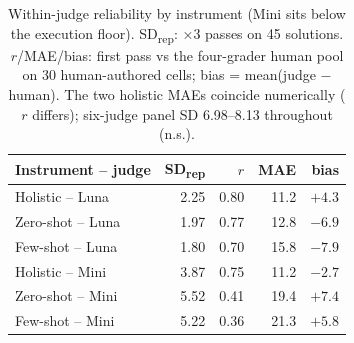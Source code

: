 \begin{table}[t]
\centering
\scriptsize
\begin{tabular}{@{}lrrrr@{}}
\toprule
Instrument – judge & SD\textsubscript{rep} & $r$ & MAE & bias \\
\midrule
Holistic – Luna & 2.25 & 0.80 & 11.2 & $+4.3$ \\
Zero-shot – Luna & 1.97 & 0.77 & 12.8 & $-6.9$ \\
Few-shot – Luna & 1.80 & 0.70 & 15.8 & $-7.9$ \\
\midrule
Holistic – Mini & 3.87 & 0.75 & 11.2 & $-2.7$ \\
Zero-shot – Mini & 5.52 & 0.41 & 19.4 & $+7.4$ \\
Few-shot – Mini & 5.22 & 0.36 & 21.3 & $+5.8$ \\
\bottomrule
\end{tabular}
\caption{Within-judge reliability by instrument (Mini sits below the execution floor). SD\textsubscript{rep}: ×3 passes on 45 solutions. $r$/MAE/bias: first pass vs the four-grader human pool on 30 human-authored cells; bias = mean(judge $-$ human). The two holistic MAEs coincide numerically ($r$ differs); six-judge panel SD 6.98–8.13 throughout (n.s.).}
\label{tab:reliability}
\end{table}